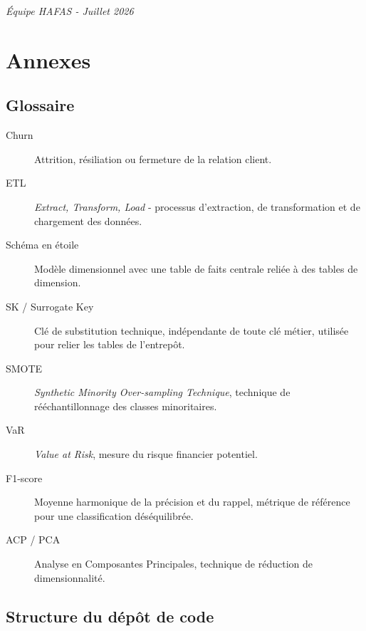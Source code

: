 \documentclass[11pt,a4paper]{report}
\begin{document}
\bigskip
\begin{flushright}
\emph{\'Equipe HAFAS - Juillet 2026}
\end{flushright}




\appendix
\chapter{Annexes}

\section{Glossaire}

\begin{description}
\item[Churn] Attrition, r\'esiliation ou fermeture de la relation client.
\item[ETL] \emph{Extract, Transform, Load} - processus d'extraction, de
  transformation et de chargement des donn\'ees.
\item[Sch\'ema en \'etoile] Mod\`ele dimensionnel avec une table de faits
  centrale reli\'ee \`a des tables de dimension.
\item[SK / Surrogate Key] Cl\'e de substitution technique, ind\'ependante de
  toute cl\'e m\'etier, utilis\'ee pour relier les tables de l'entrep\^ot.
\item[SMOTE] \emph{Synthetic Minority Over-sampling Technique}, technique de
  r\'e\'echantillonnage des classes minoritaires.
\item[VaR] \emph{Value at Risk}, mesure du risque financier potentiel.
\item[F1-score] Moyenne harmonique de la pr\'ecision et du rappel, m\'etrique
  de r\'ef\'erence pour une classification d\'es\'equilibr\'ee.
\item[ACP / PCA] Analyse en Composantes Principales, technique de r\'eduction
  de dimensionnalit\'e.
\end{description}

\section{Structure du d\'ep\^ot de code}
\end{document}
